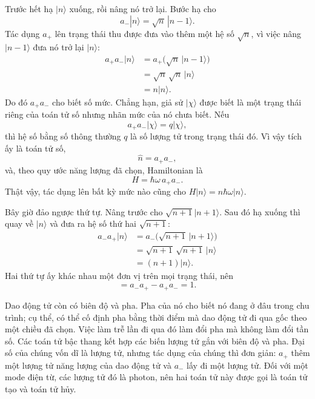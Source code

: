 Trước hết hạ \(|n\rangle\) xuống, rồi nâng nó trở lại. Bước hạ cho
\begin{equation}
a_-|n\rangle=\sqrt n\,|n-1\rangle.
\end{equation}
Tác dụng \(a_+\) lên trạng thái thu được đưa vào thêm một hệ số \(\sqrt n\), vì việc nâng \(|n-1\rangle\) đưa nó trở lại \(|n\rangle\):
\begin{align}
a_+a_-|n\rangle
&=a_+\bigl(\sqrt n\,|n-1\rangle\bigr)\\
&=\sqrt n\,\sqrt n\,|n\rangle\\
&=n|n\rangle.
\end{align}
Do đó \(a_+a_-\) cho biết số mức. Chẳng hạn, giả sử \(|\chi\rangle\) được biết là một trạng thái riêng của toán tử số nhưng nhãn mức của nó chưa biết. Nếu
\begin{equation}
a_+a_-|\chi\rangle=q|\chi\rangle,
\end{equation}
thì hệ số bằng số thông thường \(q\) là số lượng tử trong trạng thái đó. Vì vậy tích ấy là toán tử số,
\begin{equation}
\hat n=a_+a_-,
\end{equation}
và, theo quy ước năng lượng đã chọn, Hamiltonian là
\begin{equation}
H=\hbar\omega\,a_+a_-.
\end{equation}
Thật vậy, tác dụng lên bất kỳ mức nào cũng cho \(H|n\rangle=n\hbar\omega|n\rangle\).

Bây giờ đảo ngược thứ tự. Nâng trước cho \(\sqrt{n+1}|n+1\rangle\). Sau đó hạ xuống thì quay về \(|n\rangle\) và đưa ra hệ số thứ hai \(\sqrt{n+1}\):
\begin{align}
a_-a_+|n\rangle
&=a_-\bigl(\sqrt{n+1}\,|n+1\rangle\bigr)\\
&=\sqrt{n+1}\,\sqrt{n+1}\,|n\rangle\\
&=(n+1)|n\rangle.
\end{align}
Hai thứ tự ấy khác nhau một đơn vị trên mọi trạng thái, nên
\begin{equation}
[a_-,a_+]=a_-a_+-a_+a_-=1.
\end{equation}

Dao động tử còn có biên độ và pha. Pha của nó cho biết nó đang ở đâu trong chu trình; cụ thể, có thể cố định pha bằng thời điểm mà dao động tử đi qua gốc theo một chiều đã chọn. Việc làm trễ lần đi qua đó làm đổi pha mà không làm đổi tần số. Các toán tử bậc thang kết hợp các biến lượng tử gắn với biên độ và pha. Đại số của chúng vốn dĩ là lượng tử, nhưng tác dụng của chúng thì đơn giản: \(a_+\) thêm một lượng tử năng lượng của dao động tử và \(a_-\) lấy đi một lượng tử. Đối với một mode điện từ, các lượng tử đó là photon, nên hai toán tử này được gọi là toán tử tạo và toán tử hủy.


